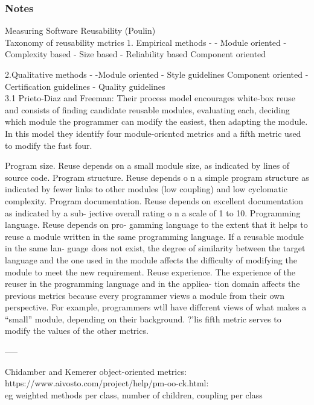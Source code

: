 \documentclass{article}
\begin{document}
\subsubsection{Notes}
Measuring Software Reusability (Poulin)\\  

Taxonomy of reusability mctrics
1. Empirical methods
-
-
Module oriented
- Complexity based
- Size based
- Reliability based
Component oriented

 2.Qualitative methods
-
-Module oriented
- Style guidelines
Component oriented
- Certification guidelines
- Quality guidelines\\

3.1 Prieto-Diaz and Freeman:
Their process model encourages
white-box reuse and consists of finding candidate
reusable modules, evaluating each, deciding which
module the programmer can modify the easiest, then
adapting the module. In this model they identify
four module-oricntcd metrics and a fifth metric used
to modify the fust four.

Program size. Reuse depends on a small module
size, as indicated by lines of source code.
Program structure. Reuse depends o n a simple
program structure as indicated by fewer links to
other modules (low coupling) and low
cyclomatic complexity.
Program documentation.
Reuse depends on
excellent documentation as indicated by a sub-
jective overall rating o n a scale of 1 to 10.
Programming language. Reuse depends on pro-
gamming language to the extent that it helps to
reuse a module written in the same programming
language. If a reusable module in the same lan-
guage does not exist, the degree of similarity
between the target language and the one used in
the module affects the difficulty of modifying the
module to meet the new requirement.
Reuse experience. The experience of the reuser
in the programming language and in the appliea-
tion domain affects the previous metrics because
every programmer views a module from their
own perspective. For example, programmers
wtll have diffcrent views of what makes a
“small” module, depending on their background.
?’lis fifth metric serves to modify the values of
the other mctrics.


-----

Chidamber and Kemerer object-oriented metrics:\\ 

https://www.aivosto.com/project/help/pm-oo-ck.html:\\ 

eg weighted methods per class, number of children, coupling per class\\ 
\end{document}
